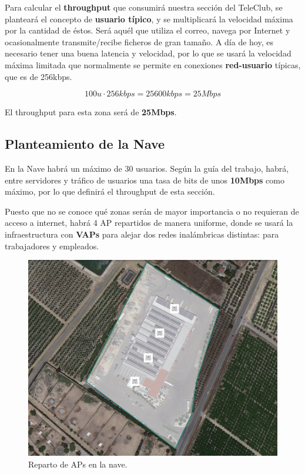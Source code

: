 \documentclass{article}
\begin{document}
\quad

Para calcular el \textbf{throughput} que consumirá nuestra sección del TeleClub, se planteará el concepto de \textbf{usuario típico}, y se multiplicará la velocidad máxima por la cantidad de éstos. Será aquél que utiliza el correo, navega por Internet y ocasionalmente transmite/recibe ficheros de gran tamaño. A día de hoy, es necesario tener una buena latencia y velocidad, por lo que se usará la velocidad máxima limitada que normalmente se permite en conexiones \textbf{red-usuario} típicas, que es de 256kbps.

    $$100u \cdot 256kbps = 25600kbps = 25Mbps $$

El throughput para esta zona será de \textbf{25Mbps}.

\subsection{Planteamiento de la Nave}

En la Nave habrá un máximo de 30 usuarios. Según la guía del trabajo, habrá, entre servidores y tráfico de usuarios una tasa de bits de unos \textbf{10Mbps} como máximo, por lo que definirá el throughput de esta sección. 

\quad

Puesto que no se conoce qué zonas serán de mayor importancia o no requieran de acceso a internet, habrá 4 AP repartidos de manera uniforme, donde se usará la infraestructura con \textbf{VAPs} para alejar dos redes inalámbricas distintas: para trabajadores y empleados.

\begin{figure}[ht]
    \centering
    \includegraphics[width=0.65\linewidth]{src/lanave.png}
    \caption{\label{fig:lanave} Reparto de APs en la nave.}
\end{figure}

\newpage
\end{document}
